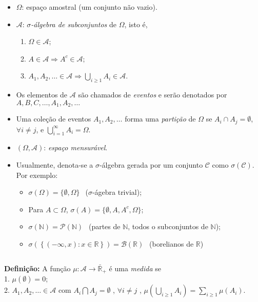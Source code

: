 \documentclass[
]{book}
\providecommand{\tightlist}{%
  \setlength{\itemsep}{0pt}\setlength{\parskip}{0pt}}
\begin{document}
\begin{itemize}
\item
  \(\Omega\): espaço amostral (um conjunto não vazio).
\item
  \(\mathcal{A}\): \emph{\(\sigma\)-álgebra de subconjuntos} de \(\Omega\), isto é,

  \begin{enumerate}
  \def\labelenumi{\arabic{enumi}.}
  \tightlist
  \item
    \(\Omega \in \mathcal{A}\);
  \item
    \(A \in \mathcal{A} \Longrightarrow A^{c} \in \mathcal{A}\);
  \item
    \(\displaystyle A_1, A_2, \ldots \in \mathcal{A} \Longrightarrow \bigcup_{i\geq1} A_i \in \mathcal{A}\).
  \end{enumerate}
\item
  Os elementos de \(\mathcal{A}\) são chamados de \emph{eventos} e serão denotados por \(A, B, C, \ldots, A_1, A_2, \ldots\)
\item
  Uma coleção de eventos \(A_1,A_2,\ldots\) forma uma \emph{partição} de \(\Omega\) se \(A_i \cap A_j = \emptyset\), \(\forall i \neq j\), e \(\displaystyle \bigcup_{i=1}^{\infty} A_i = \Omega\).
\item
  \((\Omega, \mathcal{A})\): \emph{espaço mensurável}.
\item
  Usualmente, denota-se a \(\sigma\)-álgebra gerada por um conjunto \(\mathcal{C}\) como \(\sigma(\mathcal{C})\). Por exemplo:

  \begin{itemize}
  \tightlist
  \item
    \(\sigma(\Omega) = \{\emptyset,\Omega\}~~\) (\(\sigma\)-ágebra trivial);
  \item
    Para \(A \subset \Omega\), \(\sigma(A) = \{\emptyset, A, A^c, \Omega\}\);
  \item
    \(\sigma(\mathbb{N}) = \mathcal{P}(\mathbb{N})~~\) (partes de \(\mathbb{N}\), todos o subconjuntos de \(\mathbb{N}\));
  \item
    \(\sigma\left(\left\{(-\infty,x): x \in \mathbb{R}\right\}\right) = \mathcal{B}\left(\mathbb{R}\right)~~\) (borelianos de \(\mathbb{R}\))
  \end{itemize}
\end{itemize}

\(~\)

\textbf{Definição:} A função \(\mu: \mathcal{A} \longrightarrow \bar{\mathbb{R}}_+\) é uma \emph{medida} se\\
1. \(\mu(\emptyset) = 0\);\\
2. \(\displaystyle A_1, A_2, \ldots \in \mathcal{A}\) com \(A_i \bigcap A_j = \emptyset\) , \(\forall i \neq j\) , \(\displaystyle \mu\left(\bigcup_{i \geq 1} A_i\right) = \sum_{i \geq 1} \mu\left(A_i\right)\).
\end{document}
